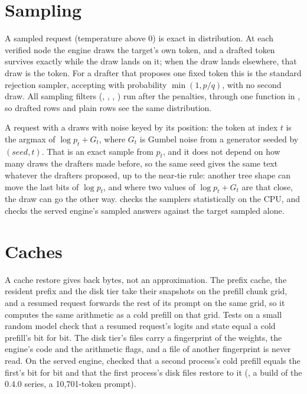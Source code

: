 \section{Sampling}

A sampled request (temperature above 0) is exact in distribution. At each verified node the engine draws the target's own token, and a drafted token survives exactly while the draw lands on it; when the draw lands elsewhere, that draw is the token. For a drafter that proposes one fixed token this is the standard rejection sampler, accepting with probability $\min(1, p/q)$, with no second draw. All sampling filters (, , , ) run after the penalties, through one function in , so drafted rows and plain rows see the same distribution.

A request with a  draws with noise keyed by its position: the token at index $t$ is the argmax of $\log p_t + G_t$, where $G_t$ is Gumbel noise from a generator seeded by $(\textit{seed}, t)$. That is an exact sample from $p_t$, and it does not depend on how many draws the drafters made before, so the same seed gives the same text whatever the drafters proposed, up to the near-tie rule: another tree shape can move the last bits of $\log p_t$, and where two values of $\log p_t + G_t$ are that close, the draw can go the other way.  checks the samplers statistically on the CPU, and  checks the served engine's sampled answers against the target sampled alone.

\section{Caches}

A cache restore gives back bytes, not an approximation. The prefix cache, the resident prefix and the disk tier take their snapshots on the prefill chunk grid, and a resumed request forwards the rest of its prompt on the same grid, so it computes the same arithmetic as a cold prefill on that grid. Tests on a small random model check that a resumed request's logits and state equal a cold prefill's bit for bit. The disk tier's files carry a fingerprint of the weights, the engine's code and the arithmetic flags, and a file of another fingerprint is never read. On the served engine,  checked that a second process's cold prefill equals the first's bit for bit and that the first process's disk files restore to it (\measured, a build of the 0.4.0 series, a 10,701-token prompt).

